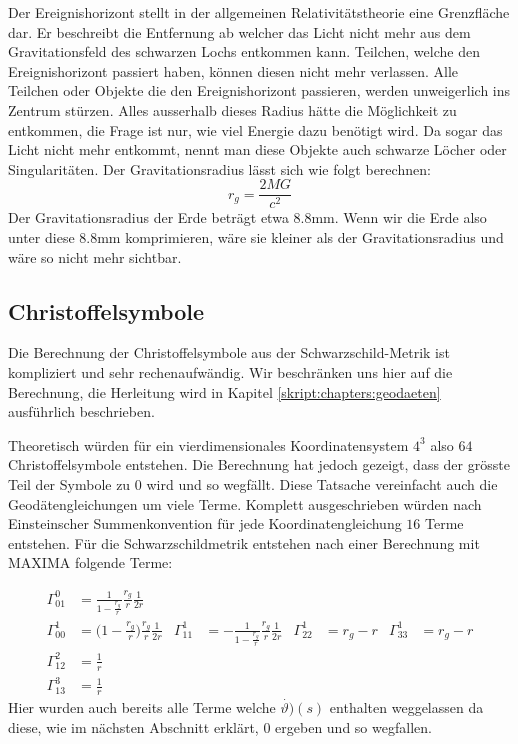 \begin{refsection}
	Der Ereignishorizont stellt in der allgemeinen Relativitätstheorie eine Grenzfläche dar. Er beschreibt die Entfernung ab welcher das Licht nicht mehr aus dem Gravitationsfeld des schwarzen Lochs entkommen kann. Teilchen, welche den Ereignishorizont passiert haben, können diesen nicht mehr verlassen. Alle Teilchen oder Objekte die den Ereignishorizont passieren, werden unweigerlich ins Zentrum stürzen. Alles ausserhalb dieses Radius hätte die Möglichkeit zu entkommen, die Frage ist nur, wie viel Energie dazu benötigt wird. Da sogar das Licht nicht mehr entkommt, nennt man diese Objekte auch schwarze Löcher oder Singularitäten.
	Der Gravitationsradius lässt sich wie folgt berechnen:
	\begin{equation} \label{Gravitationsradius}
	r_{g}= \frac{2MG}{c^2}
	\end{equation}
	Der Gravitationsradius der Erde beträgt etwa 8.8mm. Wenn wir die Erde also unter diese 8.8mm komprimieren, wäre sie kleiner als der Gravitationsradius und wäre so nicht mehr sichtbar.
	
	\subsection{Christoffelsymbole}\label{christoffel}
	
	Die Berechnung der Christoffelsymbole aus der Schwarzschild-Metrik ist kompliziert und sehr rechenaufwändig. Wir beschränken uns hier auf die Berechnung, die Herleitung wird in Kapitel \ref{skript:chapters:geodaeten} ausführlich beschrieben. 
	
	Theoretisch würden für ein vierdimensionales Koordinatensystem $4^{3}$ also $64$ Christoffelsymbole entstehen. Die Berechnung hat jedoch gezeigt, dass der grösste Teil der Symbole zu $0$ wird und so wegfällt. Diese Tatsache vereinfacht auch die Geodätengleichungen um viele Terme. Komplett ausgeschrieben würden nach Einsteinscher Summenkonvention für jede Koordinatengleichung $16$ Terme entstehen.
	Für die Schwarzschildmetrik entstehen nach einer Berechnung mit MAXIMA folgende Terme:
	
	\begin{align*}
	\Gamma^0_{01}
	&=
	\frac{1}{1-\displaystyle\frac{r_g}{r}}
	\frac{r_g}{r}
	\frac{1}{2r}
	\\
	\Gamma^1_{00}
	&=
	\biggl(1-\displaystyle\frac{r_g}{r}\biggr)
	\frac{r_g}{r}
	\frac{1}{2r}
	&
	\Gamma^1_{11}
	&=
	-\frac1{1-\displaystyle\frac{r_g}{r}}
	\frac{r_g}{r}
	\frac{1}{2r}
	&
	\Gamma^1_{22}
	&=
	r_g-r
	&
	\Gamma^1_{33}
	&=
	r_g-r
	\\
	\Gamma^2_{12}
	&=
	\frac1r
	\\
	\Gamma^3_{13}
	&=
	\frac1r
	\end{align*}
	Hier wurden auch bereits alle Terme welche $\dot{\vartheta)}(s)$ enthalten weggelassen da diese, wie im nächsten Abschnitt erklärt, $0$ ergeben und so wegfallen.
	

\end{refsection}
